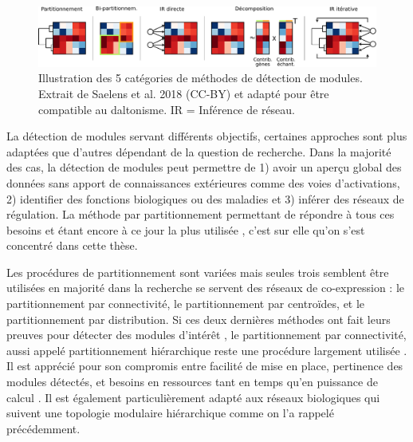 \begin{figure}[h!]
    \centering
    \includegraphics[width=\textwidth]{img/intro/3_coexpr/intro_3_coexpr_category_detection_module.pdf}
    \caption[Illustration des 5 catégories de méthodes de détection de modules.]{Illustration des 5 catégories de méthodes de détection de modules. Extrait de Saelens et al. 2018 (CC-BY) \cite{Saelens2018} et adapté pour être compatible au daltonisme. IR = Inférence de réseau.}
    \label{fig:my_label}
\end{figure}

La détection de modules servant différents objectifs, certaines approches sont plus adaptées que d'autres dépendant de la question de recherche. Dans la majorité des cas, la détection de modules peut permettre de 1) avoir un aperçu global des données sans apport de connaissances extérieures comme des voies d'activations, 2) identifier des fonctions biologiques ou des maladies et 3) inférer des réseaux de régulation. La méthode par partitionnement permettant de répondre à tous ces besoins \cite{Filteau2013,Sundarrajan2016,Kogelman2014} et étant encore à ce jour la plus utilisée \cite{Saelens2018}, c'est sur elle qu'on s'est concentré dans cette thèse.

Les procédures de partitionnement sont variées mais seules trois semblent être utilisées en majorité dans la recherche se servent des réseaux de co-expression : le partitionnement par connectivité, le partitionnement par centroïdes, et le partitionnement par distribution. Si ces deux dernières méthodes ont fait leurs preuves pour détecter des modules d'intérêt \cite{Ruan2006Dec,Shi2010Dec, Rau2017}, le partitionnement par connectivité, aussi appelé partitionnement hiérarchique reste une procédure largement utilisée \cite{Tang2018, Mao2009, Rotival2013}. Il est apprécié pour son compromis entre facilité de mise en place, pertinence des modules détectés, et besoins en ressources tant en temps qu'en puissance de calcul \cite{Saelens2018}. Il est également particulièrement adapté aux réseaux biologiques qui suivent une topologie modulaire hiérarchique comme on l'a rappelé précédemment. 

